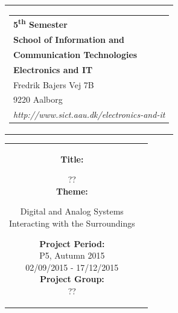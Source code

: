 % 
\thispagestyle{empty}
\begin{titlepage}
\begin{nopagebreak}
{\samepage 

\begin{tabular}{r}
\parbox{\textwidth}{  
\hfill \hspace{2cm} \parbox{8cm}{\begin{tabular}{l} %
{\small \textbf{\textcolor{aaublue}{\colorbox{white}{5\textsuperscript{th} Semester}}}}\\
{\small \textbf{\textcolor{aaublue}{School of Information and}}}\\
{\small \textbf{\textcolor{aaublue}{Communication Technologies}}}\\ 
{\small \textbf{\textcolor{aaublue}{Electronics and IT}}}\\
{\small \textcolor{aaublue}{Fredrik Bajers Vej 7B}} \\
{\small \textcolor{aaublue}{9220 Aalborg}} \\
{\small \textcolor{aaublue}{\emph{http://www.sict.aau.dk/electronics-and-it}}}
\end{tabular}}}
\end{tabular}

\begin{tabular}{cc}
\parbox{7cm}{

\textbf{Title:}

??\\ %

\textbf{Theme:} 

\small{
Digital and Analog Systems\\
Interacting with the Surroundings\\
}


\parbox{8cm}{


\textbf{Project Period:}\\
P5, Autumn 2015\\
02/09/2015 - 17/12/2015\\
   
\textbf{Project Group:}\\
??\\ %
  
}}
\end{tabular}}
\end{nopagebreak}
\end{titlepage}
